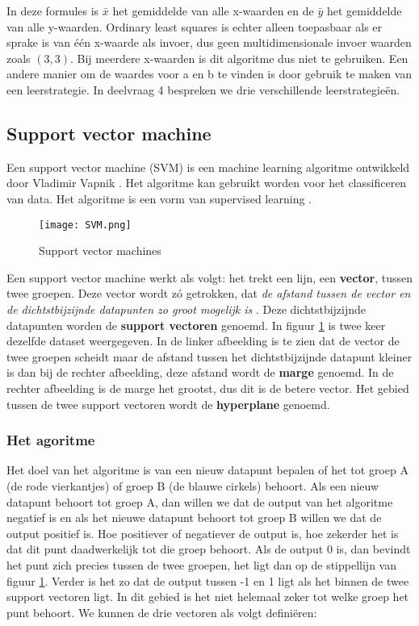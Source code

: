 In deze formules is $\bar{x}$ het gemiddelde van alle x-waarden en de $\bar{y}$ het gemiddelde van alle y-waarden. 
Ordinary least squares is echter alleen toepasbaar als er sprake is van \'{e}\'{e}n x-waarde als invoer, dus geen multidimensionale invoer waarden zoals $(3,3)$. Bij meerdere x-waarden is dit algoritme dus niet te gebruiken. Een andere manier om de waardes voor a en b te vinden is door gebruik te maken van een leerstrategie. In deelvraag 4 bespreken we drie verschillende leerstrategie\"en.

\subsection{Support vector machine}
Een support vector machine (SVM) is een machine learning algoritme ontwikkeld door Vladimir Vapnik \cite{VladimirVapnik}. Het algoritme kan gebruikt worden voor het classificeren van data. Het algoritme is een vorm van supervised learning \cite{SVM}.

\begin{figure}[H]
  \centering
    \texttt{[image: SVM.png]}
  \caption{Support vector machines}
  \label{fig:SupVectorMachine1}
\end{figure}

Een support vector machine werkt als volgt: het trekt een lijn, een \textbf{vector}, tussen twee groepen. Deze vector wordt z\'o getrokken, dat \textit{de afstand tussen de vector en de dichtstbijzijnde datapunten zo groot mogelijk is} \cite{SVM2}. Deze dichtstbijzijnde datapunten worden de \textbf{support vectoren} genoemd. In figuur \ref{fig:SupVectorMachine1} is twee keer dezelfde dataset weergegeven. In de linker afbeelding is te zien dat de vector de twee groepen scheidt maar de afstand tussen het dichtstbijzijnde datapunt kleiner is dan bij de rechter afbeelding, deze afstand wordt de \textbf{marge} genoemd. In de rechter afbeelding is de marge het grootst, dus dit is de betere vector. Het gebied tussen de twee support vectoren wordt de \textbf{hyperplane} genoemd.

\subsubsection{Het agoritme}
Het doel van het algoritme is van een nieuw datapunt bepalen of het tot groep A (de rode vierkantjes) of groep B (de blauwe cirkels) behoort. Als een nieuw datapunt behoort tot groep A, dan willen we dat de output van het algoritme negatief is en als het nieuwe datapunt behoort tot groep B willen we dat de output positief is. Hoe positiever of negatiever de output is, hoe zekerder het is dat dit punt daadwerkelijk tot die groep behoort. Als de output 0 is, dan bevindt het punt zich precies tussen de twee groepen, het ligt dan op de stippellijn van figuur \ref{fig:SupVectorMachine1}. Verder is het zo dat de output tussen -1 en 1 ligt als het binnen de twee support vectoren ligt. In dit gebied is het niet helemaal zeker tot welke groep het punt behoort. 
We kunnen de drie vectoren als volgt defini\"eren: 

